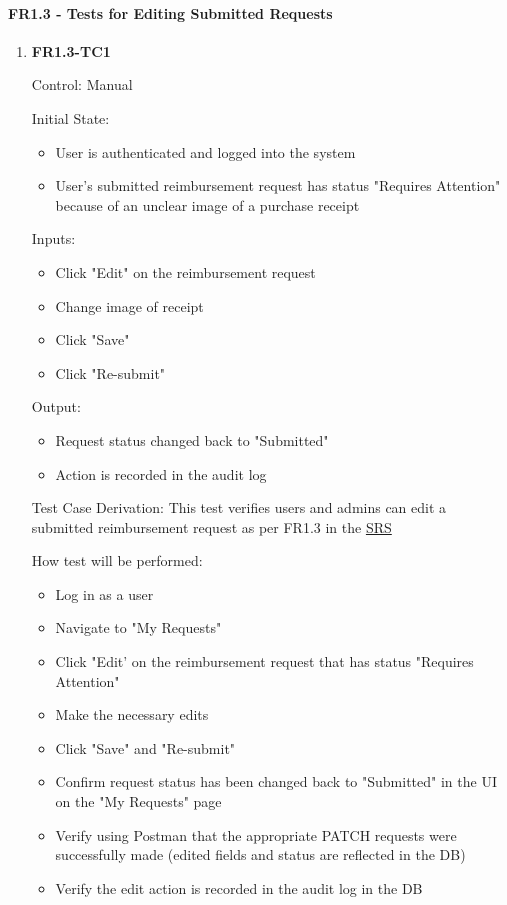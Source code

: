 \documentclass[12pt, titlepage]{article}
\begin{document}
\paragraph{FR1.3 - Tests for Editing Submitted Requests}

\begin{enumerate}
    \item{\textbf{FR1.3-TC1}}
    
    Control: Manual
    
    Initial State:
    \begin{itemize}
        \item User is authenticated and logged into the system
        \item User's submitted reimbursement request has status "Requires Attention" because of an unclear image of a purchase receipt
    \end{itemize}
    
    Inputs: 
    \begin{itemize}
        \item Click "Edit" on the reimbursement request
        \item Change image of receipt
        \item Click "Save"
        \item Click "Re-submit"
    \end{itemize}
    
    Output: 
    \begin{itemize}
        \item Request status changed back to "Submitted"
        \item Action is recorded in the audit log
    \end{itemize}
    
    Test Case Derivation: This test verifies users and admins can edit a submitted reimbursement request as per FR1.3 in the \href{https://shorturl.at/FdAgR}{SRS}
    
    How test will be performed:
    \begin{itemize}
        \item Log in as a user
        \item Navigate to "My Requests"
        \item Click "Edit' on the reimbursement request that has status "Requires Attention" 
        \item Make the necessary edits
        \item Click "Save" and "Re-submit"
        \item Confirm request status has been changed back to "Submitted" in the UI on the "My Requests" page
        \item Verify using Postman that the appropriate PATCH requests were successfully made (edited fields and status are reflected in the DB)
        \item Verify the edit action is recorded in the audit log in the DB
    \end{itemize}
\end{enumerate}
\end{document}
